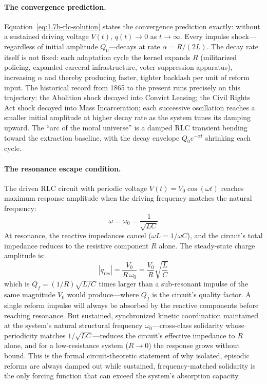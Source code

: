 \paragraph{The convergence prediction.}
Equation~\ref{eq:1.7b-rlc-solution} states the convergence prediction exactly: without a sustained driving voltage $V(t)$, $q(t) \rightarrow 0$ as $t \rightarrow \infty$. Every impulse shock---regardless of initial amplitude $Q_0$---decays at rate $\alpha = R/(2L)$. The decay rate itself is not fixed: each adaptation cycle the kernel expands $R$ (militarized policing, expanded carceral infrastructure, voter suppression apparatus), increasing $\alpha$ and thereby producing faster, tighter backlash per unit of reform input. The historical record from 1865 to the present runs precisely on this trajectory: the Abolition shock decayed into Convict Leasing; the Civil Rights Act shock decayed into Mass Incarceration; each successive oscillation reaches a smaller initial amplitude at higher decay rate as the system tunes its damping upward. The ``arc of the moral universe'' is a damped RLC transient bending toward the extraction baseline, with the decay envelope $Q_0 e^{-\alpha t}$ shrinking each cycle.

\paragraph{The resonance escape condition.}
The driven RLC circuit with periodic voltage $V(t) = V_0 \cos(\omega t)$ reaches maximum response amplitude when the driving frequency matches the natural frequency:
\begin{equation*}
\omega = \omega_0 = \frac{1}{\sqrt{LC}}
\end{equation*}
At resonance, the reactive impedances cancel ($\omega L = 1/\omega C$), and the circuit's total impedance reduces to the resistive component $R$ alone. The steady-state charge amplitude is:
\begin{equation*}
|q_{\text{res}}| = \frac{V_0}{R\,\omega_0} = \frac{V_0}{R}\sqrt{\frac{L}{C}}
\end{equation*}
which is $Q_f = (1/R)\sqrt{L/C}$ times larger than a sub-resonant impulse of the same magnitude $V_0$ would produce---where $Q_f$ is the circuit's quality factor. A single reform impulse will always be absorbed by the reactive components before reaching resonance. But sustained, synchronized kinetic coordination maintained at the system's natural structural frequency $\omega_0$---cross-class solidarity whose periodicity matches $1/\sqrt{LC}$---reduces the circuit's effective impedance to $R$ alone, and for a low-resistance system ($R \to 0$) the response grows without bound. This is the formal circuit-theoretic statement of why isolated, episodic reforms are always damped out while sustained, frequency-matched solidarity is the only forcing function that can exceed the system's absorption capacity.

